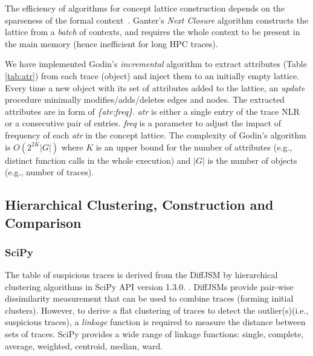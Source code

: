 %
The efficiency of algorithms for concept lattice construction
depends on the sparseness of the formal context~\cite{clgenperform}.
%
%
Ganter's \textit{Next Closure} algorithm \cite{clbook}
constructs the lattice from a
\textit{batch} of contexts, and requires the whole context to be present in the main memory
(hence inefficient for long HPC traces).
%
%

%
We have implemented Godin's \textit{incremental} algorithm \cite{clconst}
to extract attributes (Table \ref{tab:atr})
from each trace (object) and inject them to an initially empty lattice.
%
Every time a new object with its set of attributes added to the lattice,
an \textit{update} procedure minimally modifies/adds/deletes edges and nodes.
%
%
The extracted attributes are in form of \textit{\{atr:freq\}}. 
%
\textit{atr} is either a single entry of the trace NLR or a consecutive pair of entries.
\textit{freq} is a parameter to adjust the impact of frequency of each \textit{atr}
in the concept lattice.
%
The complexity of Godin's algorithm is $O(2^{2K}|G|)$ where $K$ is an upper bound for the number of attributes (e.g., distinct function calls in the whole execution) and $|G|$ is the number of objects (e.g., number of traces).




\subsection{Hierarchical Clustering, Construction and Comparison}
 \label{subsec:algo-bscore}
 
\subsubsection{SciPy}
The table of suspicious traces is derived from the DiffJSM by hierarchical clustering algorithms in SciPy API version 1.3.0. \cite{scipy}.
%
DiffJSMs provide pair-wise dissimilarity measurement that can be used to combine traces (forming initial clusters).
%
However, to derive a flat clustering of traces to detect the outlier(s)(i.e., suspicious traces), a \textit{linkage} function is required to measure the distance between sets of traces.
%
SciPy provides a wide range of linkage functions: single, complete, average, weighted, centroid, median, ward.

